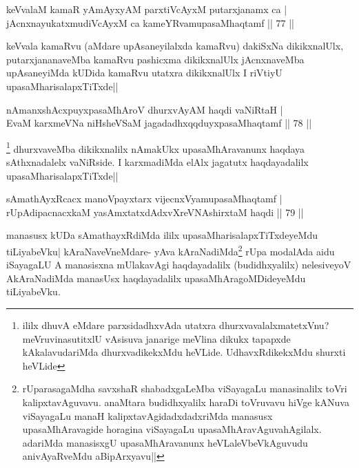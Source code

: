 \begin{shl}
keVvalaM kamaR yAmAyxyAM parxtiVcAyxM putarxjanamx ca |\\
jAcnxnayukatxmudiVcAyxM ca kameYRvamupasaMhaqtamf \hfill || 77 ||
\end{shl}

\begin{artha}
keVvala kamaRvu (aMdare upAsaneyilalxda kamaRvu) dakiSxNa dikikxnalUlx, putarxjananaveMba kamaRvu pashicxma dikikxnalUlx jAcnxnaveMba upAsaneyiMda kUDida kamaRvu utatxra dikikxnalUlx I riVtiyU upasaMharisalapxTiTxde||
\end{artha}

\begin{shl}
nAmanxshAcxpuyxpasaMhAroV dhurxvAyAM haqdi vaNiRtaH |\\
EvaM karxmeVNa niHsheVSaM jagadadhxqqduyxpasaMhaqtamf \hfill || 78 ||
\end{shl}

\begin{artha}
\footnote[1]{ililx dhuvA eMdare parxsidadhxvAda utatxra dhurxvavalalxmatetxVnu? meVruvinasutitxlU vAsisuva janarige meVlina dikukx tapapxde kAkalavudariMda dhurxvadikekxMdu heVLide. UdhavxRdikekxMdu shurxti heVLide} dhurxvaveMba dikikxnalilx nAmakUkx upasaMhAravanunx haqdaya sAthxnadalelx vaNiRside. I karxmadiMda elAlx jagatutx haqdayadalilx upasaMharisalapxTiTxde||
\end{artha}


\begin{shl}
sAmathAyxRcacx manoV\s payxtarx vijecnxVyamupasaMhaqtamf |\\
rUpAdipacnacxkaM yasAmxtatxdAdxvXreVNA\s \s shirxtaM haqdi \hfill || 79 ||
\end{shl}

\begin{artha}
manasusx kUDa sAmathayxRdiMda ililx upasaMharisalapxTiTxdeyeMdu tiLiyabeVku| kAraNaveVneMdare- yAva kAraNadiMda\footnote[2]{rUparasagaMdha savxshaR shabadxgaLeMba viSayagaLu manasinalilx toVri kalipxtavAguvavu. anaMtara budidhxyalilx haraDi toVruvavu hiVge kANuva viSayagaLu manaH kalipxtavAgidadxdadxriMda manasusx upasaMhAravagide horagina viSayagaLu upasaMhAravAguvahAgilalx. adariMda manasisxgU upasaMhAravanunx heVLaleVbeVkAguvudu anivAyaRveMdu aBipArxyavu||} rUpa modalAda aidu iSayagaLU A manasisxna mUlakavAgi haqdayadalilx (budidhxyalilx) nelesiveyoV AkAraNadiMda manasUsx haqdayadalilx upasaMhAragoMDideyeMdu tiLiyabeVku.
\end{artha}%


